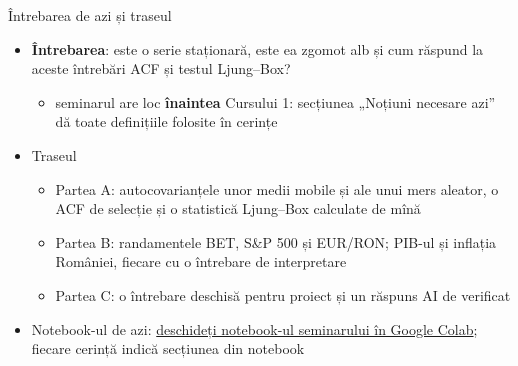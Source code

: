 \begin{frame}{Întrebarea de azi și traseul}
\itemsize{\small}
\begin{itemize}
    \item \textbf{Întrebarea}: este o serie staționară, este ea zgomot alb și cum răspund la aceste întrebări ACF și testul Ljung--Box?
    \begin{itemize}
        \item seminarul are loc \textbf{înaintea} Cursului 1: secțiunea „Noțiuni necesare azi” dă toate definițiile folosite în cerințe
    \end{itemize}
    \item Traseul
    \begin{itemize}
        \item Partea A: autocovarianțele unor medii mobile și ale unui mers aleator, o ACF de selecție și o statistică Ljung--Box calculate de mînă
        \item Partea B: randamentele BET, S\&P 500 și EUR/RON; PIB-ul și inflația României, fiecare cu o întrebare de interpretare
        \item Partea C: o întrebare deschisă pentru proiect și un răspuns AI de verificat
    \end{itemize}
    \item Notebook-ul de azi: \href{\nb}{deschideți notebook-ul seminarului în Google Colab}; fiecare cerință indică secțiunea din notebook
\end{itemize}
\end{frame}

